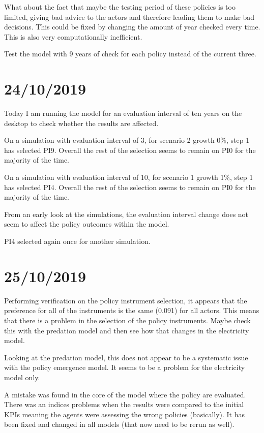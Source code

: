 What about the fact that maybe the testing period of these policies is too limited, giving bad advice to the actors and therefore leading them to make bad decisions. This could be fixed by changing the amount of year checked every time. This is also very computationally inefficient.

Test the model with 9 years of check for each policy instead of the current three.

\section{24/10/2019}

Today I am running the model for an evaluation interval of ten years on the desktop to check whether the results are affected.

On a simulation with evaluation interval of 3, for scenario 2 growth 0\%, step 1 has selected PI9. Overall the rest of the selection seems to remain on PI0 for the majority of the time.

On a simulation with evaluation interval of 10, for scenario 1 growth 1\%, step 1 has selected PI4. Overall the rest of the selection seems to remain on PI0 for the majority of the time.

From an early look at the simulations, the evaluation interval change does not seem to affect the policy outcomes within the model.

PI4 selected again once for another simulation.

\section{25/10/2019}

Performing verification on the policy instrument selection, it appears that the preference for all of the instruments is the same (0.091) for all actors. This means that there is a problem in the selection of the policy instruments. Maybe check this with the predation model and then see how that changes in the electricity model.

Looking at the predation model, this does not appear to be a systematic issue with the policy emergence model. It seems to be a problem for the electricity model only.

A mistake was found in the core of the model where the policy are evaluated. There was an indices problems when the results were compared to the initial KPIs meaning the agents were assessing the wrong policies (basically). It has been fixed and changed in all models (that now need to be rerun as well).

